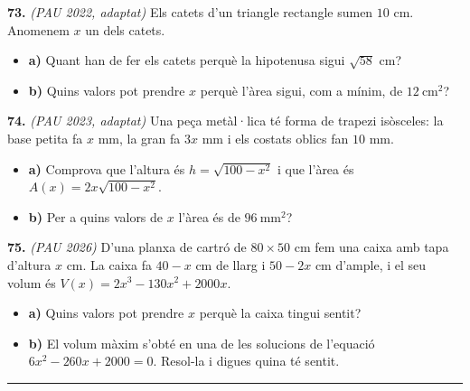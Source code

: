 \documentclass[13pt,a4paper]{extarticle}
\begin{document}
\par\noindent\begin{minipage}{\linewidth}
\textbf{73.} \emph{(PAU 2022, adaptat)} Els catets d'un triangle rectangle sumen $10$ cm. Anomenem $x$ un dels catets.\par

\begin{itemize}[leftmargin=0pt,itemsep=6pt,topsep=4pt,parsep=0pt,label={}]
\item \textbf{a)} Quant han de fer els catets perquè la hipotenusa sigui $\sqrt{58}$ cm?
\item \textbf{b)} Quins valors pot prendre $x$ perquè l'àrea sigui, com a mínim, de $12\ \text{cm}^2$?
\end{itemize}
\end{minipage}\par\vspace{1.6mm}
\par\noindent\begin{minipage}{\linewidth}
\textbf{74.} \emph{(PAU 2023, adaptat)} Una peça metàl·lica té forma de trapezi isòsceles: la base petita fa $x$ mm, la gran fa $3x$ mm i els costats oblics fan $10$ mm.\par

\begin{itemize}[leftmargin=0pt,itemsep=6pt,topsep=4pt,parsep=0pt,label={}]
\item \textbf{a)} Comprova que l'altura és $h=\sqrt{100-x^2}$ i que l'àrea és $A(x)=2x\sqrt{100-x^2}$.
\item \textbf{b)} Per a quins valors de $x$ l'àrea és de $96\ \text{mm}^2$?
\end{itemize}
\end{minipage}\par\vspace{1.6mm}
\par\noindent\begin{minipage}{\linewidth}
\textbf{75.} \emph{(PAU 2026)} D'una planxa de cartró de $80\times 50$ cm fem una caixa amb tapa d'altura $x$ cm. La caixa fa $40-x$ cm de llarg i $50-2x$ cm d'ample, i el seu volum és $V(x)=2x^3-130x^2+2000x$.\par

\begin{itemize}[leftmargin=0pt,itemsep=6pt,topsep=4pt,parsep=0pt,label={}]
\item \textbf{a)} Quins valors pot prendre $x$ perquè la caixa tingui sentit?
\item \textbf{b)} El volum màxim s'obté en una de les solucions de l'equació $6x^2-260x+2000=0$. Resol-la i digues quina té sentit.
\end{itemize}
\end{minipage}\par\vspace{1.6mm}
\vspace{1mm}\hrule\vspace{3mm}
\end{document}
